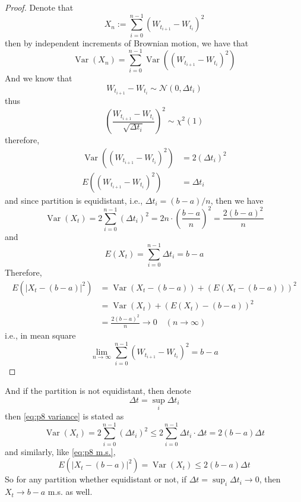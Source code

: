 \documentclass{homework}
\DeclareMathOperator{\var}{Var}
\begin{document}
    \problem
    \begin{proof}
        Denote that
        \[X_n:=\sum_{i=0}^{n-1}(W_{t_{i+1}}-W_{t_i})^2\]
        then by independent increments of  Brownian motion, we have that
        \[\var(X_n)=\sum_{i=0}^{n-1}\var((W_{t_{i+1}}-W_{t_i})^2)\]
        And we know that
        \[W_{t_{i+1}}-W_{t_i}\sim\mathcal N(0,\Delta t_i)\]
        thus
        \[\left(\frac{W_{t_{i+1}}-W_{t_i}}{\sqrt{\Delta t_i}}\right)^2
        \sim\chi^2(1)\]
        therefore,
        \[\begin{aligned}
            \var((W_{t_{i+1}}-W_{t_i})^2)&=2(\Delta t_i)^2\\
            E((W_{t_{i+1}}-W_{t_i})^2)&=\Delta t_i
        \end{aligned}\]
        and since partition is equidistant, i.e., 
        $\Delta t_i=(b-a)/n$, then we have
        \begin{equation}
            \label{eq:p8 variance}
            \var(X_t)=2\sum_{i=0}^{n-1}(\Delta t_i)^2
            =2n\cdot\left(\frac{b-a}{n}\right)^2
            =\frac{2(b-a)^2}{n}
        \end{equation}
        and
        \[E(X_t)=\sum_{i=0}^{n-1}\Delta t_i=b-a\]
        Therefore,
        \begin{equation}
            \label{eq:p8 m.s.}
            \begin{aligned}
            E(|X_t-(b-a)|^2)&=\var(X_t-(b-a))+(E(X_t-(b-a)))^2\\
            &=\var(X_t)+(E(X_t)-(b-a))^2\\
            &=\frac{2(b-a)^2}{n}\to 0\quad(n\to\infty)
            \end{aligned}
        \end{equation}
        i.e., in mean square
        \[\lim_{n\to\infty}\sum_{i=0}^{n-1}(W_{t_{i+1}}-W_{t_i})^2=b-a\]
    \end{proof}

    And if the partition is not equidistant, then denote
    \[\Delta t=\sup_{i}\Delta t_i\]
    then \cref{eq:p8 variance} is stated as
    \[\var(X_t)=2\sum_{i=0}^{n-1}(\Delta t_i)^2
    \leq 2\sum_{i=0}^{n-1}\Delta t_i\cdot\Delta t
    =2(b-a)\Delta t\]
    and similarly, like \cref{eq:p8 m.s.},
    \[E(|X_t-(b-a)|^2)=\var(X_t)\leq 2(b-a)\Delta t\]
    So for any partition whether equidistant or not,
    if $\Delta t=\sup_i\Delta t_i\to 0$,
    then $X_t\to b-a$ m.s. as well.
\end{document}
